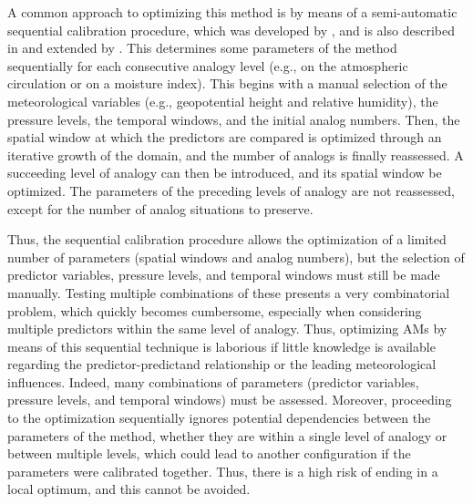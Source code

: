\documentclass{ametsoc}
\begin{document}
A common approach to optimizing this method is by means of a semi-automatic sequential calibration procedure, which was developed by \citet{Bontron2004}, and is also described in \citet{BenDaoud2016} and extended by \citet{Radanovics2013}. This determines some parameters of the method sequentially for each consecutive analogy level (e.g., on the atmospheric circulation or on a moisture index). This begins with a manual selection of the meteorological variables (e.g., geopotential height and relative humidity), the pressure levels, the temporal windows, and the initial analog numbers. Then, the spatial window at which the predictors are compared is optimized through an iterative growth of the domain, and the number of analogs is finally reassessed. A succeeding level of analogy can then be introduced, and its spatial window be optimized. The parameters of the preceding levels of analogy are not reassessed, except for the number of analog situations to preserve.

Thus, the sequential calibration procedure allows the optimization of a limited number of parameters (spatial windows and analog numbers), but the selection of predictor variables, pressure levels, and temporal windows must still be made manually. Testing multiple combinations of these presents a very combinatorial problem, which quickly becomes cumbersome, especially when considering multiple predictors within the same level of analogy. Thus, optimizing AMs by means of this sequential technique is laborious if little knowledge is available regarding the predictor-predictand relationship or the leading meteorological influences. Indeed, many combinations of parameters (predictor variables, pressure levels, and temporal windows) must be assessed. Moreover, proceeding to the optimization sequentially ignores potential dependencies between the parameters of the method, whether they are within a single level of analogy or between multiple levels, which could lead to another configuration if the parameters were calibrated together. Thus, there is a high risk of ending in a local optimum, and this cannot be avoided. 
\end{document}

